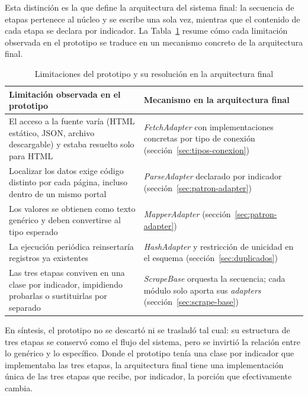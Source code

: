 \documentclass[12pt,letterpaper,oneside]{report}
\begin{document}
Esta distinci\'on es la que define la arquitectura del sistema final: la secuencia de etapas pertenece al n\'ucleo y se escribe una sola vez, mientras que el contenido de cada etapa se declara por indicador. La Tabla~\ref{tab:prototipo-arquitectura} resume c\'omo cada limitaci\'on observada en el prototipo se traduce en un mecanismo concreto de la arquitectura final.

\begin{table}[H]
\centering
\caption{Limitaciones del prototipo y su resoluci\'on en la arquitectura final}
\label{tab:prototipo-arquitectura}
\begin{tabular}{|p{6cm}|p{6cm}|}
\hline
\textbf{Limitaci\'on observada en el prototipo} & \textbf{Mecanismo en la arquitectura final} \\
\hline
El acceso a la fuente var\'ia (HTML est\'atico, JSON, archivo descargable) y estaba resuelto solo para HTML & \textit{FetchAdapter} con implementaciones concretas por tipo de conexi\'on (secci\'on~\ref{sec:tipos-conexion}) \\
\hline
Localizar los datos exige c\'odigo distinto por cada p\'agina, incluso dentro de un mismo portal & \textit{ParseAdapter} declarado por indicador (secci\'on~\ref{sec:patron-adapter}) \\
\hline
Los valores se obtienen como texto gen\'erico y deben convertirse al tipo esperado & \textit{MapperAdapter} (secci\'on~\ref{sec:patron-adapter}) \\
\hline
La ejecuci\'on peri\'odica reinsertar\'ia registros ya existentes & \textit{HashAdapter} y restricci\'on de unicidad en el esquema (secci\'on~\ref{sec:duplicados}) \\
\hline
Las tres etapas conviven en una clase por indicador, impidiendo probarlas o sustituirlas por separado & \textit{ScrapeBase} orquesta la secuencia; cada m\'odulo solo aporta sus \textit{adapters} (secci\'on~\ref{sec:scrape-base}) \\
\hline
\end{tabular}
\end{table}

En s\'intesis, el prototipo no se descart\'o ni se traslad\'o tal cual: su estructura de tres etapas se conserv\'o como el flujo del sistema, pero se invirti\'o la relaci\'on entre lo gen\'erico y lo espec\'ifico. Donde el prototipo ten\'ia una clase por indicador que implementaba las tres etapas, la arquitectura final tiene una implementaci\'on \'unica de las tres etapas que recibe, por indicador, la porci\'on que efectivamente cambia.
\end{document}
